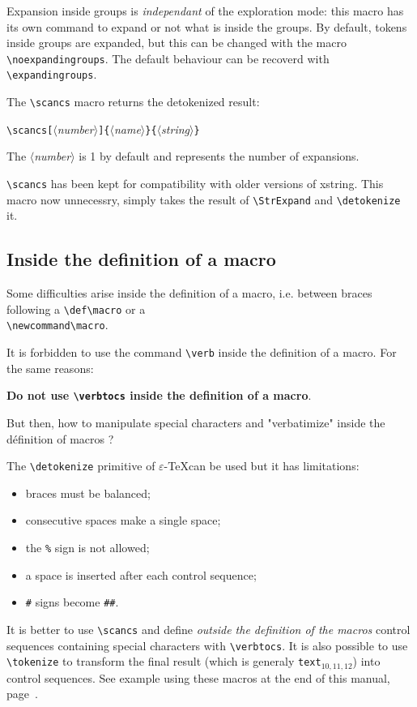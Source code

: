 \documentclass[a4paper,10pt]{article}
\newcommand\argu[1]{$\langle$\textit{#1}$\rangle$}
\newcommand\ARGU[1]{\texttt{\{}\argu{#1}\texttt{\}}}
\newcommand\arguC[1]{\texttt{[}\argu{#1}\texttt{]}}
\newcommand\texte[1]{\texttt{text}${}_{#1}$}
\newcommand\Xstring{\textsf{xstring}\xspace}
\newcommand\verbinline{\lstinline[basicstyle=\normalsize\ttfamily]}
\begin{document}
Expansion inside groups is \emph{independant} of the exploration mode: this macro has its own command to expand or not what is inside the groups. By default, tokens inside groups are expanded, but this can be changed with the macro \verbinline-\noexpandingroups-. The default behaviour can be recoverd with \verbinline-\expandingroups-.\bigskip

The \verbinline-\scancs- macro returns the detokenized result:\par\nobreak\medskip
\verbinline|\scancs|\arguC{number}\ARGU{name}\ARGU{string}\par\nobreak\smallskip
The \argu{number} is 1 by default and represents the number of expansions.\smallskip

\verbinline-\scancs-  has been kept for compatibility with older versions of \Xstring. This macro now unnecessry, simply takes the result of \verbinline|\StrExpand| and \verbinline|\detokenize| it.

\subsection{Inside the definition of a macro}
Some difficulties arise inside the definition of a macro, i.e. between braces following a \verbinline|\def\macro| or a\\\verbinline|\newcommand\macro|.\medskip

It is forbidden to use the command \verbinline|\verb| inside the definition of a macro. For the same reasons:\par\medskip
\hfill\textbf{Do not use \texttt{\textbackslash verbtocs} inside the definition of a macro}.\hfill{}\medskip

But then, how to manipulate special characters and "verbatimize" inside the définition of macros ?\bigskip

The \verbinline|\detokenize| primitive of $\varepsilon$-\TeX can be used but it has limitations:
\begin{itemize}
	\item braces must be balanced;
	\item consecutive spaces make a single space;
	\item the \verb|%| sign is not allowed;
	\item a space is inserted after each control sequence;
	\item \verb|#| signs become  \verb|##|.
\end{itemize}
\medskip

It is better to use \verbinline|\scancs| and define \emph{outside the definition of the macros} control sequences containing special characters with \verbinline|\verbtocs|. It is also possible to use \verbinline|\tokenize| to transform the final result (which is generaly \texte{10,11,12}) into control sequences. See example using these macros at the end of this manual, page~\pageref{exemples}.\medskip
\end{document}
